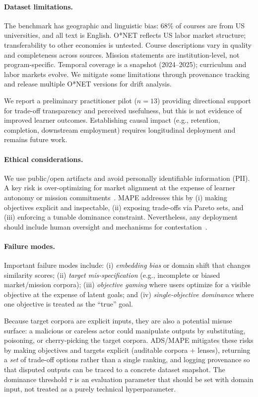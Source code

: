 \documentclass[sigconf,review]{acmart}
\newcommand{\ADS}{\textsc{ADS}\xspace}
\newcommand{\MAPE}{\textsc{MAPE}\xspace}
\begin{document}
\paragraph{Dataset limitations.}
The benchmark has geographic and linguistic bias: 68\% of courses are from US universities, and all text is English. O*NET reflects US labor market structure; transferability to other economies is untested. Course descriptions vary in quality and completeness across sources. Mission statements are institution-level, not program-specific. Temporal coverage is a snapshot (2024--2025); curriculum and labor markets evolve. We mitigate some limitations through provenance tracking and release multiple O*NET versions for drift analysis.

We report a preliminary practitioner pilot ($n{=}13$) providing directional support for trade-off transparency and perceived usefulness, but this is not evidence of improved learner outcomes. Establishing causal impact (e.g., retention, completion, downstream employment) requires longitudinal deployment and remains future work.

\paragraph{Ethical considerations.}
We use public/open artifacts and avoid personally identifiable information (PII). A key risk is over-optimizing for market alignment at the expense of learner autonomy or mission commitments~\cite{ekstrand2019fairness}. \MAPE addresses this by (i) making objectives explicit and inspectable, (ii) exposing trade-offs via Pareto sets, and (iii) enforcing a tunable dominance constraint. Nevertheless, any deployment should include human oversight and mechanisms for contestation~\cite{alfrink2023contestable,dignum2025contesting}.

\paragraph{Failure modes.}
Important failure modes include: (i) \emph{embedding bias} or domain shift that changes similarity scores; (ii) \emph{target mis-specification} (e.g., incomplete or biased market/mission corpora); (iii) \emph{objective gaming} where users optimize for a visible objective at the expense of latent goals; and (iv) \emph{single-objective dominance} where one objective is treated as the ``true'' goal.

Because target corpora are explicit inputs, they are also a potential misuse surface: a malicious or careless actor could manipulate outputs by substituting, poisoning, or cherry-picking the target corpora. \ADS/\MAPE mitigates these risks by making objectives and targets explicit (auditable corpora + lenses), returning a \emph{set} of trade-off options rather than a single ranking, and logging provenance so that disputed outputs can be traced to a concrete dataset snapshot. The dominance threshold $\tau$ is an evaluation parameter that should be set with domain input, not treated as a purely technical hyperparameter.
\end{document}
